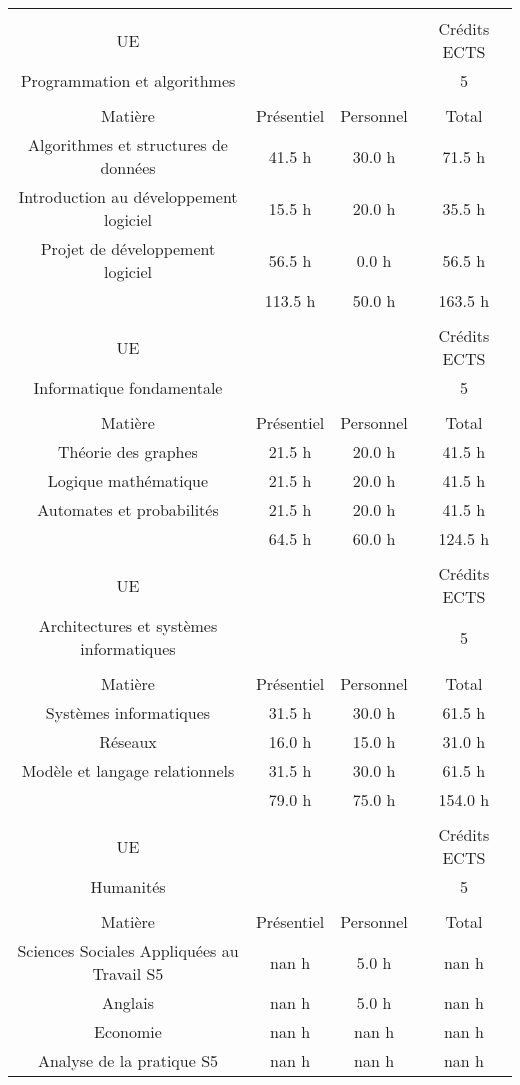 \begin{longtable}{c c c c}%
&&&\\%
UE&&&Crédits ECTS\\%
Programmation et algorithmes&&&5\\%
&&&\\%
Matière&Présentiel&Personnel&Total\\%
Algorithmes et structures de données&41.5 h&30.0 h&71.5 h\\%
Introduction au développement logiciel&15.5 h&20.0 h&35.5 h\\%
Projet de développement logiciel&56.5 h&0.0 h&56.5 h\\%
\hline%
&113.5 h&50.0 h&163.5 h\\%
\hline%
&&&\\%
UE&&&Crédits ECTS\\%
Informatique fondamentale&&&5\\%
&&&\\%
Matière&Présentiel&Personnel&Total\\%
Théorie des graphes&21.5 h&20.0 h&41.5 h\\%
Logique mathématique&21.5 h&20.0 h&41.5 h\\%
Automates et probabilités&21.5 h&20.0 h&41.5 h\\%
\hline%
&64.5 h&60.0 h&124.5 h\\%
\hline%
&&&\\%
UE&&&Crédits ECTS\\%
Architectures et systèmes informatiques&&&5\\%
&&&\\%
Matière&Présentiel&Personnel&Total\\%
Systèmes informatiques&31.5 h&30.0 h&61.5 h\\%
Réseaux&16.0 h&15.0 h&31.0 h\\%
Modèle et langage relationnels&31.5 h&30.0 h&61.5 h\\%
\hline%
&79.0 h&75.0 h&154.0 h\\%
\hline%
&&&\\%
UE&&&Crédits ECTS\\%
Humanités&&&5\\%
&&&\\%
Matière&Présentiel&Personnel&Total\\%
Sciences Sociales Appliquées au Travail S5&nan h&5.0 h&nan h\\%
Anglais&nan h&5.0 h&nan h\\%
Economie&nan h&nan h&nan h\\%
Analyse de la pratique S5&nan h&nan h&nan h\\%

\end{longtable}
